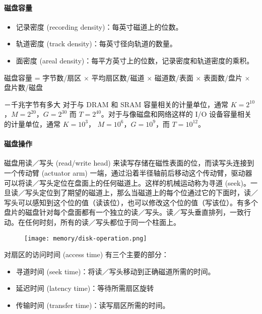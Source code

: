 \paragraph{磁盘容量}
\begin{itemize}
    \item 记录密度 (recording density)：每英寸磁道上的位数。
    \item 轨道密度 (track density)：每英寸径向轨道的数量。
    \item 面密度 (areal density)：每平方英寸上的位数，记录密度和轨道密度的乘积。
\end{itemize}
\begin{center}
磁盘容量 = 字节数/扇区 $\times$ 平均扇区数/磁道 $\times$ 磁道数/表面 $\times$ 表面数/盘片 $\times$ 盘片数/磁盘
\end{center}
\begin{sidenote}{－千兆字节有多大}
对于与 DRAM 和 SRAM 容量相关的计量单位，通常 $K=2^{10}$，$M=2^{20}$，$G=2^{30}$ 而
$T= 2^{40}$。对于与像磁盘和网络这样的 I/O 设备容量相关的计量单位，通常 $K = 10^{3}$，
$M= 10^{6}$，$G = 10^{9}$，而 $T=10^{12}$。
\end{sidenote}

\paragraph{磁盘操作}

磁盘用读／写头 (read/write head) 来读写存储在磁性表面的位，而读写头连接到一个传动臂 (actuator arm) 一端，通过沿着半径轴前后移动这个传动臂，驱动器可以将读／写头定位在盘面上的任何磁道上。这样的机械运动称为寻道 (seek)。一旦读／写头定位到了期望的磁道上，那么当磁道上的每个位通过它的下面时，读／写头可以感知到这个位的值（读该位），也可以修改这个位的值（写该位）。有多个盘片的磁盘针对每个盘面都有一个独立的读／写头。读／写头垂直排列，一致行动。在任何时刻，所有的读／写头都位于同一个柱面上。

\begin{figure}[H]
    \centering
    \texttt{[image: memory/disk-operation.png]}
\end{figure}

对扇区的访问时间 (access time) 有三个主要的部分：
\begin{itemize}
    \item 寻道时间 (seek time)：将读／写头移动到正确磁道所需的时间。
    \item 延迟时间 (latency time)：等待所需扇区旋转
    \item 传输时间 (transfer time)：读写扇区所需的时间。
\end{itemize}


